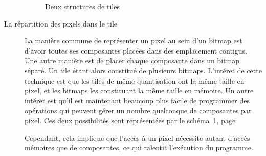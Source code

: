 \begin{description}
			\begin{figure}[h]
				\centering
				\caption{Deux structures de tiles}
				\label{fig:tilestruct}
			\end{figure}
				\item[La répartition des pixels dans le tile] La manière commune de représenter un pixel au sein d'un bitmap est d'avoir
				toutes ses composantes placées dans des emplacement contigus. Une autre manière est de placer chaque composante dans un
				bitmap séparé. Un tile étant alors constitué de plusieurs bitmaps. L'intéret de cette technique est que les tiles de même
				quantisation ont la même taille en pixel, et les bitmaps les constituant la même taille en mémoire. Un autre intérèt est
				qu'il est maintenant beaucoup plus facile de programmer des opérations qui peuvent gérer un nombre quelconque de composantes
				par pixel. Ces deux possibilités sont représentées par le schéma~\ref{fig:tilestruct}, page~\pageref{fig:tilestruct}

				Cependant, cela implique que l'accès à un pixel nécessite autant d'accès mémoires que de composantes, ce qui ralentit 
				l'exécution du programme. 
			\end{description}

